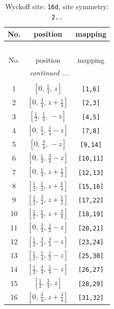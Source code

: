 \documentclass[fleqn,8pt]{jsarticle}
\begin{document}
\renewcommand{\arraystretch}{1.2}
\begin{longtable}{ccc}
\caption{Wyckoff site: {\tt 16d}, site symmetry: {\tt 2..}}
 \\
 \hline \hline
No. & position & mapping \\ \hline \endfirsthead

\multicolumn{2}{l}{\tablename\ \thetable{}} \\
 \hline \hline
No. & position & mapping \\ \hline \endhead

 \hline \hline
\multicolumn{2}{r}{\footnotesize\it continued ...} \\ \endfoot

 \hline \hline
\multicolumn{2}{r}{} \\ \endlastfoot

1 & $\left[ 0,\, \frac{1}{4},\, z \right]$ & {\tt [1,6]} \\ \hline
2 & $\left[ 0,\, \frac{3}{4},\, z + \frac{1}{4} \right]$ & {\tt [2,3]} \\ \hline
3 & $\left[ \frac{1}{2},\, \frac{1}{4},\, - z \right]$ & {\tt [4,5]} \\ \hline
4 & $\left[ 0,\, \frac{1}{4},\, \frac{1}{4} - z \right]$ & {\tt [7,8]} \\ \hline
5 & $\left[ 0,\, \frac{3}{4},\, - z \right]$ & {\tt [9,14]} \\ \hline
6 & $\left[ 0,\, \frac{1}{4},\, \frac{3}{4} - z \right]$ & {\tt [10,11]} \\ \hline
7 & $\left[ 0,\, \frac{1}{4},\, z + \frac{1}{2} \right]$ & {\tt [12,13]} \\ \hline
8 & $\left[ \frac{1}{2},\, \frac{1}{4},\, z + \frac{1}{4} \right]$ & {\tt [15,16]} \\ \hline
9 & $\left[ \frac{1}{2},\, \frac{3}{4},\, z + \frac{1}{2} \right]$ & {\tt [17,22]} \\ \hline
10 & $\left[ \frac{1}{2},\, \frac{1}{4},\, z + \frac{3}{4} \right]$ & {\tt [18,19]} \\ \hline
11 & $\left[ 0,\, \frac{3}{4},\, \frac{1}{2} - z \right]$ & {\tt [20,21]} \\ \hline
12 & $\left[ \frac{1}{2},\, \frac{3}{4},\, \frac{3}{4} - z \right]$ & {\tt [23,24]} \\ \hline
13 & $\left[ \frac{1}{2},\, \frac{1}{4},\, \frac{1}{2} - z \right]$ & {\tt [25,30]} \\ \hline
14 & $\left[ \frac{1}{2},\, \frac{3}{4},\, \frac{1}{4} - z \right]$ & {\tt [26,27]} \\ \hline
15 & $\left[ \frac{1}{2},\, \frac{3}{4},\, z \right]$ & {\tt [28,29]} \\ \hline
16 & $\left[ 0,\, \frac{3}{4},\, z + \frac{3}{4} \right]$ & {\tt [31,32]} \\
\end{longtable}
\end{document}
